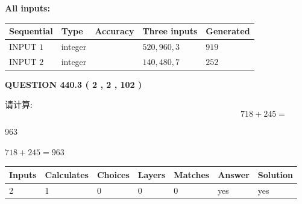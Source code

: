 \documentclass{ctexart}
\begin{document}
   
   
   
\noindent\vspace{0.1in}\hspace{-0.08in} {\textbf{\Large{All inputs: }}}
   
   
  
  
\noindent\begin{tabular}{|l|l|l|l|l|}
\hline
 Sequential & Type & Accuracy & Three inputs & Generated \\ 
\hline
 
 
  INPUT $  1 $ & integer &  & $
 520
 , 
 960
 , 
 3
 $ & $ 919 $ 
 \\  \hline  
 
 
  INPUT $  2 $ & integer &  & $
 140
 , 
 480
 , 
 7
 $ & $ 252 $ 
 \\  \hline  
 \end{tabular}
   
   
  
\vspace{0.2in}
  
{\textbf{\Large{QUESTION
440.3 
 ( 2 , 2 , 102 )
}}}
  
  
 
请计算:
\begin{equation}
718 +  %
245 = \nonumber
\end{equation}
 
 
 
\noindent{}
 
 

963
 
 
\noindent{}
 
 

 
 
 
\noindent{}
 
 

$ %
718 +  %
245=   %
963$
 
 
\noindent{}
 
 

 
   
   
   
   
\noindent\begin{tabular}{|l|l|l|l|l|l|l|}
 \hline
Inputs & Calculates & Choices & Layers & Matches & Answer & Solution \\ \hline
 2  & 
 1  & 
 0
  & 
 0  & 
 0  & 
  yes & 
  yes 
  \\ \hline
 \end{tabular}
   
\end{document}
